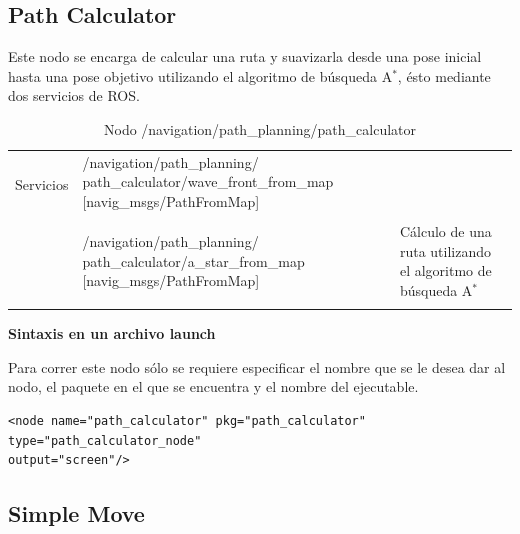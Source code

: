 \documentclass[user_manual.tex]{subfiles}
\begin{document}
\subsection{Path Calculator}
Este nodo se encarga de calcular una ruta y suavizarla desde una pose inicial hasta una pose objetivo utilizando el algoritmo de búsqueda A$ ^{*} $, ésto mediante dos servicios de ROS.\\
\begin{table}[H]
\begin{center}
\begin{tabular}{|l|p{6.8cm}|p{5cm}|}%
\hline

\multirow{2}{*}{Servicios}
& /navigation/path\_planning/ \newline path\_calculator/wave\_front\_from\_map [navig\_msgs/PathFromMap] &  \\
& & \\
& /navigation/path\_planning/ \newline path\_calculator/a\_star\_from\_map [navig\_msgs/PathFromMap] & Cálculo de una ruta utilizando el algoritmo de búsqueda A$ ^{*} $ \\
& & \\
\cline{1-3}

\end{tabular}
\caption{Nodo /navigation/path\_planning/path\_calculator}
\label{path calculator node}
\end{center}
\end{table}

\textbf{Sintaxis en un archivo launch}

Para correr este nodo sólo se requiere especificar el nombre que se le desea dar al nodo, el paquete en el que se encuentra y el nombre del ejecutable.\\
\begin{verbatim}
<node name="path_calculator" pkg="path_calculator" type="path_calculator_node" 
output="screen"/>
\end{verbatim}

\subsection{Simple Move}
\end{document}
